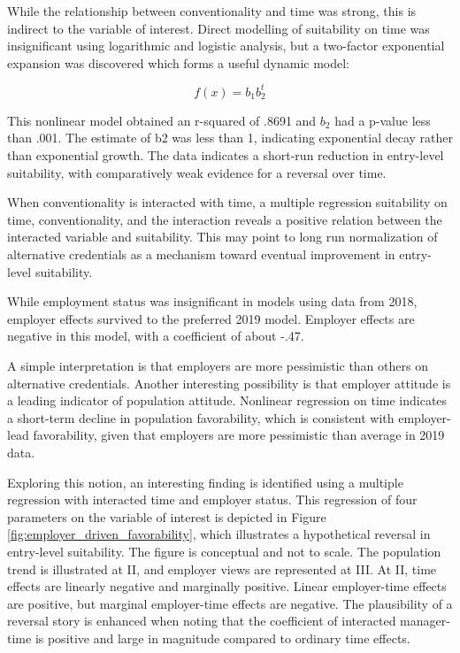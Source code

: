 \documentclass[AER]{./aea-latex-templates/AEA}
\begin{document}
        While the relationship between conventionality and time was strong,
        this is indirect to the variable of interest. Direct modelling of suitability
        on time was insignificant using logarithmic and logistic analysis, but
        a two-factor exponential expansion was discovered which forms a useful dynamic model:
        
        \begin{equation} f(x) = b_1b_2^t \end{equation}
        
        This nonlinear model obtained an r-squared of .8691 and $b_2$ had a p-value
        less than .001. The estimate of b2 was less than 1, indicating exponential
        decay rather than exponential growth. The data indicates a short-run reduction in entry-level
        suitability, with comparatively weak evidence for a reversal over time.
        
        When conventionality is interacted with time, a multiple regression suitability on time, conventionality, and the interaction
        reveals a positive relation between the interacted variable and suitability.
        This may point to long run normalization of alternative credentials as a mechanism toward eventual improvement in entry-level suitability.
        
        While employment status was insignificant in models using data from 2018,
        employer effects survived to the preferred 2019 model.
        Employer effects are negative in this model, with a coefficient of about -.47.
        
        A simple interpretation is that employers are more pessimistic than others
        on alternative credentials. Another interesting possibility is that employer attitude is a leading indicator of population attitude.
        Nonlinear regression on time indicates a short-term decline in population favorability,
        which is consistent with employer-lead favorability, given that employers are more pessimistic than average in 2019 data.
        
        Exploring this notion, an interesting finding is identified using a multiple regression with interacted time and employer status.
        This regression of four parameters on the variable of interest is depicted in
        Figure \ref{fig:employer_driven_favorability}, which illustrates a hypothetical reversal in entry-level
        suitability. The figure is conceptual and not to scale. The population
        trend is illustrated at II, and employer views are represented at III. At II,
        time effects are linearly negative and marginally positive. Linear
        employer-time effects are positive, but marginal employer-time effects are
        negative. The plausibility of a reversal story is enhanced when noting
        that the coefficient of interacted manager-time is positive and large in magnitude compared to ordinary time effects.
        
\end{document}

